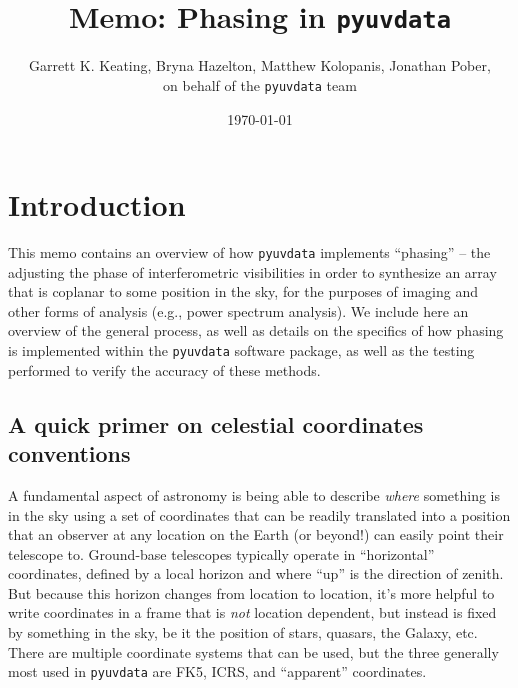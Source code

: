 \documentclass[11pt, oneside]{article}
\title{Memo: Phasing in \texttt{pyuvdata}}
\author{Garrett K. Keating, Bryna Hazelton, Matthew Kolopanis, Jonathan Pober, \\ on behalf of the \texttt{pyuvdata} team}
\date{\today}
\begin{document}
\maketitle

\section{Introduction}\label{sec:intro}
This memo contains an overview of how \texttt{pyuvdata} implements ``phasing'' -- the adjusting the phase of interferometric visibilities in order to synthesize an array that is coplanar to some position in the sky, for the purposes of imaging and other forms of analysis (e.g., power spectrum analysis). We include here an overview of the general process, as well as details on the specifics of how phasing is implemented within the \texttt{pyuvdata} software package, as well as the testing performed to verify the accuracy of these methods.


\subsection{A quick primer on celestial coordinates conventions}
A fundamental aspect of astronomy is being able to describe \emph{where} something is in the sky using a set of coordinates that can be readily translated into a position that an observer at any location on the Earth (or beyond!) can easily point their telescope to. Ground-base telescopes typically operate in ``horizontal'' coordinates, defined by a local horizon and where ``up'' is the direction of zenith. But because this horizon changes from location to location, it's more helpful to write coordinates in a frame that is \emph{not} location dependent, but instead is fixed by something in the sky, be it the position of stars, quasars, the Galaxy, etc. There are multiple coordinate systems that can be used, but the three generally most used in \texttt{pyuvdata} are FK5, ICRS, and ``apparent'' coordinates.
\end{document}
